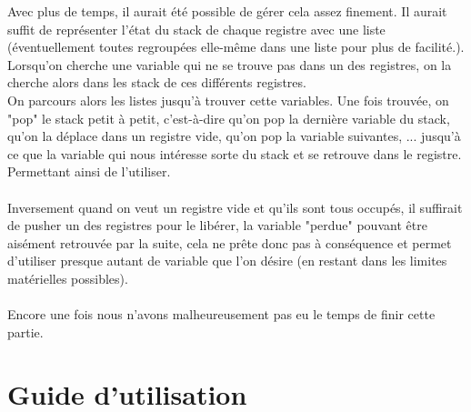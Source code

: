 \documentclass[a4paper,10pt]{article}
\begin{document}
		Avec plus de temps, il aurait été possible de gérer cela assez finement. Il aurait suffit de représenter l'état du stack de chaque registre avec une liste (éventuellement toutes regroupées elle-même dans une liste pour plus de facilité.). Lorsqu'on cherche une variable qui ne se trouve pas dans un des registres, on la cherche alors dans les stack de ces différents registres.\\
		On parcours alors les listes jusqu'à trouver cette variables. Une fois trouvée, on "pop" le stack petit à petit, c'est-à-dire qu'on pop la dernière variable du stack, qu'on la déplace dans un registre vide, qu'on pop la variable suivantes, ... jusqu'à ce que la variable qui nous intéresse sorte du stack et se retrouve dans le registre. Permettant ainsi de l'utiliser.\\
		~\\
		Inversement quand on veut un registre vide et qu'ils sont tous occupés, il suffirait de pusher un des registres pour le libérer, la variable "perdue" pouvant être aisément retrouvée par la suite, cela ne prête donc pas à conséquence et permet d'utiliser presque autant de variable que l'on désire (en restant dans les limites matérielles possibles).\\
		~\\
		Encore une fois nous n'avons malheureusement pas eu le temps de finir cette partie.

\section{Guide d'utilisation}
\end{document}
